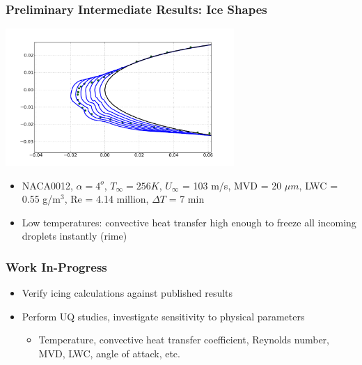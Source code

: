 \documentclass[9pt]{beamer}
\begin{document}
\begin{frame}
\frametitle{Preliminary Intermediate Results: Ice Shapes}
\label{sec-3-5}

    \centering
    \includegraphics[width=0.65\textwidth]{Rime405Example.png}

\begin{itemize}
\item NACA0012, $\alpha = 4^o$, $T_{\infty} = 256 K$, $U_{\infty}$ = 103 m/s, MVD = 20 $\mu m$, LWC = 0.55 g/m$^3$, Re = 4.14 million, $\Delta T$ = 7 min
\item Low temperatures: convective heat transfer high enough to freeze all incoming droplets instantly (rime)
\end{itemize}
\end{frame}
\begin{frame}
\frametitle{Work In-Progress}
\label{sec-3-6}

\begin{itemize}
\item Verify icing calculations against published results
\item Perform UQ studies, investigate sensitivity to physical parameters
\begin{itemize}
\item Temperature, convective heat transfer coefficient, Reynolds number, MVD, LWC, angle of attack, etc.
\end{itemize}
\end{itemize}
\end{frame}
\end{document}
